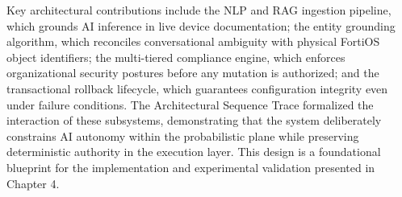 Key architectural contributions include the NLP and RAG ingestion pipeline, which grounds AI inference in live device documentation; the entity grounding algorithm, which reconciles conversational ambiguity with physical FortiOS object identifiers; the multi-tiered compliance engine, which enforces organizational security postures before any mutation is authorized; and the transactional rollback lifecycle, which guarantees configuration integrity even under failure conditions. The Architectural Sequence Trace formalized the interaction of these subsystems, demonstrating that the system deliberately constrains AI autonomy within the probabilistic plane while preserving deterministic authority in the execution layer. This design is a foundational blueprint for the implementation and experimental validation presented in Chapter 4.
